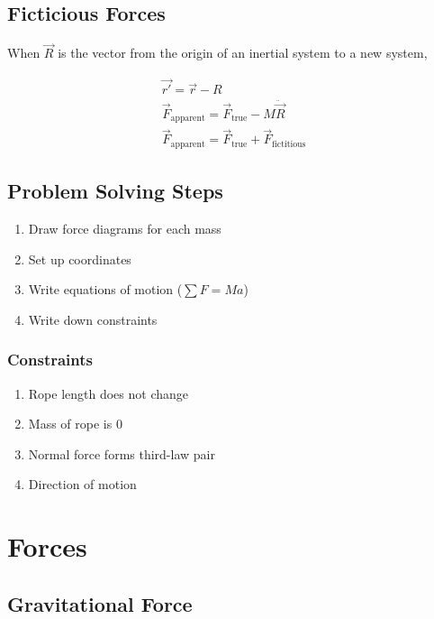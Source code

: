 \documentclass{notes}
\begin{document}
\subsection{Ficticious Forces}

When \(\vec{R}\) is the vector from the origin of an inertial system to a new system,

\begin{gather}
    \vec{r'} = \vec{r} - R\\
    \vec{F}_\text{apparent} = \vec{F}_\text{true} - M\ddot{\vec{R}}\\
    \vec{F}_\text{apparent} = \vec{F}_\text{true} + \vec{F}_\text{fictitious}
\end{gather}

\subsection{Problem Solving Steps}

\begin{enumerate}
    \item Draw force diagrams for each mass
    \item Set up coordinates
    \item Write equations of motion (\(\sum F = Ma\))
    \item Write down constraints
\end{enumerate}

\subsubsection{Constraints}

\begin{enumerate}
    \item Rope length does not change
    \item Mass of rope is 0
    \item Normal force forms third-law pair
    \item Direction of motion
\end{enumerate}

\section{Forces}

\subsection{Gravitational Force}
\end{document}
